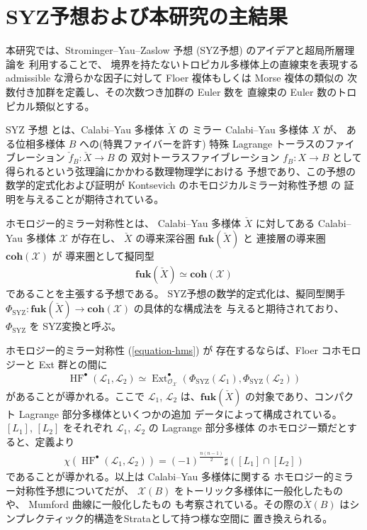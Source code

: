 \documentclass[a4paper,dvipdfmx,reqno,12pt]{amsart}
\theoremstyle{definition}
\newcommand{\opn}[1]{\operatorname{#1}}
\newcommand{\catn}[1]{\mathbf{#1}}
\numberwithin{equation}{section}
\begin{document}
\section{SYZ予想および本研究の主結果}

本研究では、Strominger--Yau--Zaslow 予想 (SYZ予想)
のアイデアと超局所層理論\cite{MR1299726}を
利用することで、
境界を持たないトロピカル多様体上の直線束を表現する 
admissible な滑らかな因子に対して
Floer 複体もしくは Morse 複体の類似の
次数付き加群を定義し、その次数つき加群の 
Euler 数を 直線束の Euler 数のトロピカル類似とする。

SYZ 予想\cite{stromingerMirrorSymmetryTduality1996}
とは、Calabi--Yau 多様体 $\check{X}$ の
ミラー Calabi--Yau 多様体 $X$ が、
ある位相多様体 $B$ への(特異ファイバーを許す)
特殊 Lagrange トーラスのファイブレーション
$\check{f}_{B}\colon \check{X}\to B$ の
双対トーラスファイブレーション $f_{B}\colon X\to B$
として得られるという弦理論にかかわる数理物理学における
予想であり、この予想の数学的定式化および証明が 
Kontsevich のホモロジカルミラー対称性予想
\cite{MR1403918}の
証明を与えることが期待されている。

ホモロジー的ミラー対称性とは、
Calabi--Yau 多様体 $\check{X}$ に対してある
Calabi--Yau 多様体 $\mathcal{X}$ が存在し、
$\check{X}$ の導来深谷圏 $\catn{fuk}(\check{X})$ と
連接層の導来圏 $\catn{coh}(\mathcal{X})$ が
導来圏として擬同型
\begin{align} \label{equation-hms}
\catn{fuk}(\check{X})\simeq \catn{coh}(\mathcal{X})
\end{align}
であることを主張する予想である。
SYZ予想の数学的定式化は、擬同型関手
$\Phi_{\opn{SYZ}}\colon \catn{fuk}(\check{X})
\to \catn{coh}(\mathcal{X})$ の具体的な構成法を
与えると期待されており、
$\Phi_{\opn{SYZ}}$ を SYZ変換と呼ぶ。

ホモロジー的ミラー対称性 (\ref{equation-hms}) が
存在するならば、Floer コホモロジーと Ext 群との間に
\begin{align}
\opn{HF}^{\bullet}(\mathscr{L}_1,\mathscr{L}_2)
\simeq \opn{Ext}^{\bullet}_{\mathcal{O}_{\mathcal{X}}}(\Phi_{\opn{SYZ}}(\mathscr{L}_1),
\Phi_{\opn{SYZ}}(\mathscr{L}_2))
\end{align}
があることが導かれる。ここで
$\mathscr{L}_1$, $\mathscr{L}_2$ は、$\catn{fuk}(\check{X})$
の対象であり、コンパクト Lagrange 部分多様体といくつかの追加
データによって構成されている。$[L_1]$, $[L_2]$ をそれぞれ
$\mathscr{L}_1$, $\mathscr{L}_2$ の Lagrange 部分多様体
のホモロジー類だとすると、定義より
\begin{align}
\chi(\opn{HF}^{\bullet}(\mathscr{L}_1,\mathscr{L}_2))=
(-1)^{\frac{n(n-1)}{2}} \sharp ([L_1]\cap [L_2])
\end{align}
であることが導かれる。以上は Calabi--Yau 多様体に関する
ホモロジー的ミラー対称性予想についてだが、
$\mathcal{X}(B)$ をトーリック多様体に一般化したもの
\cite{MR2449059}や、
Mumford 曲線に一般化したもの\cite{auroux2022lagrangian}
も考察されている。その際の$\check{X}(B)$ 
はシンプレクティック的構造をStrataとして持つ様な空間に
置き換えられる。
\end{document}

